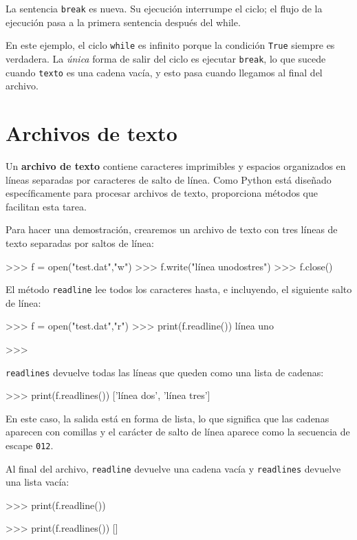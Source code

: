 La sentencia \texttt{break} es nueva. Su ejecución interrumpe el ciclo;
el flujo de la ejecución pasa a la primera sentencia después del while.

 

En este ejemplo, el ciclo \texttt{while} es infinito porque la condición
\texttt{True} siempre es verdadera. La {\em única} forma de salir
del ciclo es ejecutar \texttt{break}, lo que sucede cuando \texttt{texto}
es una cadena vacía, y esto pasa cuando llegamos al final del archivo.

\section{Archivos de texto}

 

Un \textbf{archivo de texto} contiene caracteres imprimibles y espacios
organizados en líneas separadas por caracteres de salto de línea.
Como Python está diseñado específicamente para procesar archivos de
texto, proporciona métodos que facilitan esta tarea.

Para hacer una demostración, crearemos un archivo de texto con tres
líneas de texto separadas por saltos de línea:
\begin{pyconcode}
>>> f = open("test.dat","w")
>>> f.write("línea uno dos tres\n")
>>> f.close()
\end{pyconcode}

El método \texttt{readline} lee todos los caracteres hasta, e incluyendo,
el siguiente salto de línea:
\begin{pyconcode}
>>> f = open("test.dat","r")
>>> print(f.readline())
línea uno

>>>
\end{pyconcode}

\texttt{readlines} devuelve todas las líneas que queden como una lista
de cadenas:
\begin{pyconcode}
>>> print(f.readlines())
['línea dos', 'línea tres']
\end{pyconcode}

En este caso, la salida está en forma de lista, lo que significa que
las cadenas aparecen con comillas y el carácter de salto de línea
aparece como la secuencia de escape \texttt{012}.

Al final del archivo, \texttt{readline} devuelve una cadena vacía
y \texttt{readlines} devuelve una lista vacía:
\begin{pyconcode}
>>> print(f.readline())

>>> print(f.readlines())
[]
\end{pyconcode}

